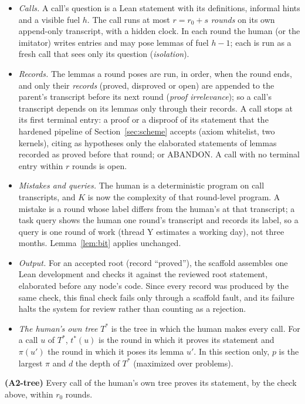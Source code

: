 \documentclass[11pt]{article}
\theoremstyle{definition}
\theoremstyle{remark}
\newcommand{\K}{K}
\begin{document}
\begin{itemize}[nosep]
\item \emph{Calls.} A call's question is a Lean statement with its definitions, informal hints and a visible fuel $h$. The call runs at most $r=r_0+s$ \emph{rounds} on its own append-only transcript, with a hidden clock. In each round the human (or the imitator) writes entries and may pose lemmas of fuel $h-1$; each is run as a fresh call that sees only its question (\emph{isolation}).
\item \emph{Records.} The lemmas a round poses are run, in order, when the round ends, and only their \emph{records} (proved, disproved or open) are appended to the parent's transcript before its next round (\emph{proof irrelevance}); so a call's transcript depends on its lemmas only through their records. A call stops at its first terminal entry: a proof or a disproof of its statement that the hardened pipeline of Section~\ref{sec:scheme} accepts (axiom whitelist, two kernels), citing as hypotheses only the elaborated statements of lemmas recorded as proved before that round; or ABANDON. A call with no terminal entry within $r$ rounds is open.
\item \emph{Mistakes and queries.} The human is a deterministic program on call transcripts, and $\K$ is now the complexity of that round-level program. A mistake is a round whose label differs from the human's at that transcript; a task query shows the human one round's transcript and records its label, so a query is one round of work (thread Y estimates a working day), not three months. Lemma~\ref{lem:bit} applies unchanged.
\item \emph{Output.} For an accepted root (record ``proved''), the scaffold assembles one Lean development and checks it against the reviewed root statement, elaborated before any node's code. Since every record was produced by the same check, this final check fails only through a scaffold fault, and its failure halts the system for review rather than counting as a rejection.
\item \emph{The human's own tree} $T^*$ is the tree in which the human makes every call. For a call $u$ of $T^*$, $t^*(u)$ is the round in which it proves its statement and $\pi(u')$ the round in which it poses its lemma $u'$. In this section only, $p$ is the largest $\pi$ and $d$ the depth of $T^*$ (maximized over problems).
\end{itemize}

\textbf{(A2-tree)} Every call of the human's own tree proves its statement, by the check above, within $r_0$ rounds.
\end{document}
